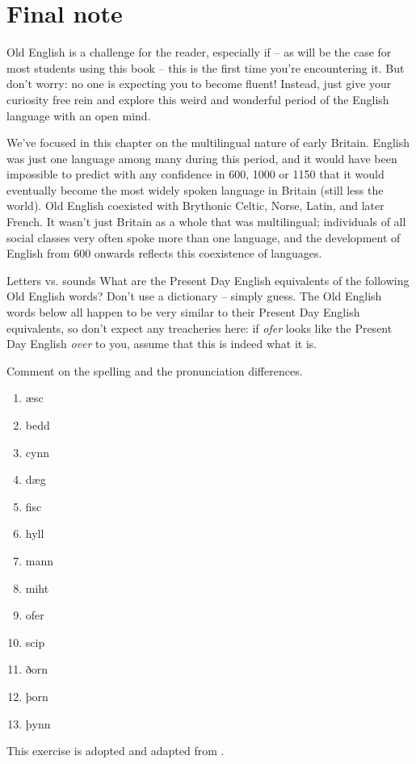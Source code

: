\section{Final note}

Old English is a challenge for the reader, especially if -- as will be the case for most students using this book -- this is the first time you're encountering it. But don't worry: no one is expecting you to become fluent! Instead, just give your curiosity free rein and explore this weird and wonderful period of the English language with an open mind.

We've focused in this chapter on the multilingual nature of early Britain. English was just one language among many during this period, and it would have been impossible to predict with any confidence in 600, 1000 or 1150 that it would eventually become the most widely spoken language in Britain (still less the world). Old English coexisted with Brythonic Celtic, Norse, Latin, and later French. It wasn't just Britain as a whole that was multilingual; individuals of all social classes very often spoke more than one language, and the development of English from 600 onwards reflects this coexistence of languages.



\begin{exercises}{Letters vs. sounds}\label{exercise-OE-spelling}
What are the Present Day English equivalents of the following Old English words? Don't use a dictionary -- simply guess. The Old English words below all happen to be very similar to their Present Day English equivalents, so don't expect any treacheries here: if \textit{ofer} looks like the Present Day English \textit{over} to you, assume that this is indeed what it is.

Comment on the spelling and the pronunciation differences. 
\clearpage

\begin{multicols}{2}
\begin{enumerate}
  \item æsc
  \item bedd
  \item cynn
  \item dæg
  \item fisc
  \item hyll
  \item mann
  \item miht
  \item ofer
  \item scip
  \item ðorn
  \item þorn
  \item þynn
\end{enumerate}
\end{multicols}
				
\noindent This exercise is adopted and adapted from \citet{HoggAlcorn2012}.

\end{exercises}

